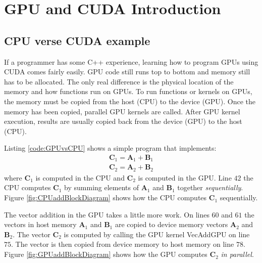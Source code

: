 \section{GPU and CUDA Introduction}
\subsection{CPU verse CUDA example}
If a programmer has some C++ experience, learning how to program GPUs using CUDA comes fairly easily.
GPU code still runs top to bottom and memory still has to be allocated.
The only real difference is the physical location of the memory and how functions run on GPUs.
To run functions or kernels on GPUs, the memory must be copied from the host (CPU) to the device (GPU).
Once the memory has been copied, parallel GPU kernels are called.
After GPU kernel execution, results are usually copied back from the device (GPU) to the host (CPU).

Listing \ref{code:GPUvsCPU} shows a simple program that implements:
\begin{equation}
\begin{matrix}
\mathbf{C}_1 = \mathbf{A}_1 + \mathbf{B}_1 \\
\mathbf{C}_2 = \mathbf{A}_2 + \mathbf{B}_2
\end{matrix}
\end{equation}
where $\mathbf{C}_1$ is computed in the CPU and $\mathbf{C}_2$ is computed in the GPU.
Line $42$ the CPU computes $\mathbf{C}_1$ by summing elements of $\mathbf{A}_1$ and $\mathbf{B}_1$ together \textit{sequentially}. Figure \ref{fig:CPUaddBlockDiagram} shows how the CPU computes $\mathbf{C}_1$  sequentially.

The vector addition in the GPU takes a little more work. 
On lines $60$ and $61$ the vectors in host memory $\mathbf{A}_1$ and $\mathbf{B}_1$ are copied to device memory vectors $\mathbf{A}_2$ and $\mathbf{B}_2$.
The vector $\mathbf{C}_2$ is computed by calling the GPU kernel VecAddGPU on line $75$.
The vector is then copied from device memory to host memory on line $78$.
Figure \ref{fig:GPUaddBlockDiagram} shows how the GPU computes $\mathbf{C}_2$ \textit{in parallel}.

